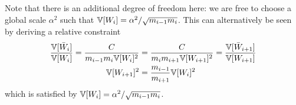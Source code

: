 Note that there is an additional degree of freedom here: we are free to choose a global scale $\alpha^2$ such that $\mathbb{V}[W_{i}] = \alpha^2 / \sqrt{m_{i-1} m_{i}}$.
This can alternatively be seen by deriving a relative constraint
\begin{align}
\frac{\mathbb{V}[\bar{W}_{i}]}{\mathbb{V}[W_{i}]} = \frac{C}{m_{i-1} m_{i} \mathbb{V}[W_{i}]^2}
  & = \frac{C}{m_{i} m_{i+1} \mathbb{V}[W_{i+1}]^2} = \frac{\mathbb{V}[\bar{W}_{i+1}]}{\mathbb{V}[W_{i+1}]} \\
\mathbb{V}[W_{i+1}]^2 & = \frac{m_{i-1}}{m_{i+1}} \mathbb{V}[W_{i}]^2
\end{align}
which is satisfied by $\mathbb{V}[W_{i}] = \alpha^2 / \sqrt{m_{i-1} m_{i}}$.


